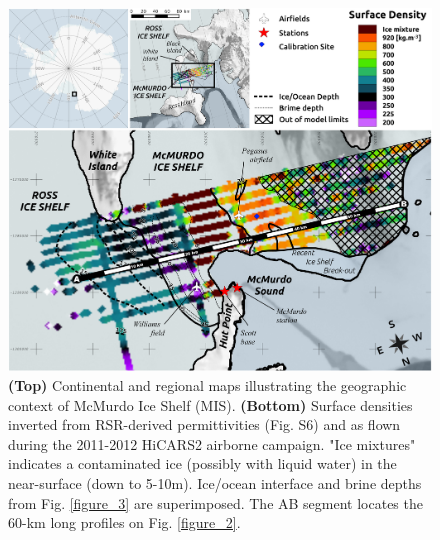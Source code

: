 \documentclass[draft,grl]{agutex}
\begin{document}
%
%
\newpage

 \begin{figure}
  \noindent\includegraphics[width=\textwidth]{fig1}
 \caption{\textbf{(Top)} Continental and regional maps illustrating the geographic context of McMurdo Ice Shelf (MIS). \textbf{(Bottom)} Surface densities inverted from RSR-derived permittivities (Fig. S6) and as flown during the 2011-2012 HiCARS2 airborne campaign. "Ice mixtures" indicates a contaminated ice (possibly with liquid water) in the near-surface (down to 5-10m). Ice/ocean interface and brine depths from Fig. \ref{figure_3} are superimposed. The AB segment locates the 60-km long profiles on Fig. \ref{figure_2}.}
  \label{figure_1}
 \end{figure}
\end{document}
